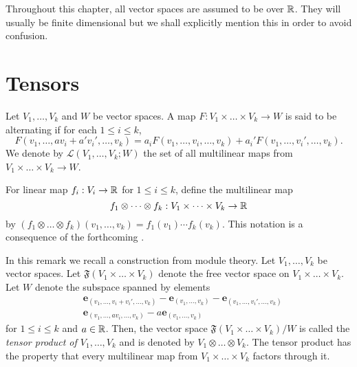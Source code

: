 Throughout this chapter, all vector spaces are assumed to be over $\mathbb{R}$. They will usually be finite dimensional but we shall explicitly mention this in order to avoid confusion.

\section{Tensors}

\begin{definition}
    Let $V_1,\dots,V_k$ and $W$ be vector spaces. A map $F: V_1\times\dots\times V_k\to W$ is said to be alternating if for each $1\le i\le k$, 
    \begin{equation*}
        F(v_1,\dots,av_i + a'v_i',\dots,v_k) = a_iF(v_1,\dots,v_i,\dots,v_k) + a_i'F(v_1,\dots,v_i',\dots,v_k).
    \end{equation*}
    We denote by $\mathscr L(V_1,\dots,V_k;W)$ the set of all multilinear maps from $V_1\times\dots\times V_k\to W$.
\end{definition}

For linear map $f_i: V_i\to\mathbb{R}$ for $1\le i\le k$, define the multilinear map 
\begin{equation*}
    f_1\otimes\dots\otimes f_k: V_1\times\dots\times V_k\to\mathbb{R}
\end{equation*}
by $(f_1\otimes\dots\otimes f_k)(v_1,\dots,v_k) = f_1(v_1)\cdots f_k(v_k)$. This notation is a consequence of the forthcoming .

\begin{remark}
    In this remark we recall a construction from module theory. Let $V_1,\dots,V_k$ be vector spaces. Let $\mathfrak F(V_1\times\dots\times V_k)$ denote the free vector space on $V_1\times\dots\times V_k$. Let $W$ denote the subspace spanned by elements 
    \begin{align*}
        & \mathbf{e}_{(v_1,\dots,v_i + v_i',\dots,v_k)} - \mathbf{e}_{(v_1,\dots,v_k)} - \mathbf{e}_{(v_1,\dots,v_i',\dots,v_k)}\\
        & \mathbf{e}_{(v_1,\dots,av_i,\dots,v_k)} - a\mathbf{e}_{(v_1,\dots,v_k)}
    \end{align*}
    for $1\le i\le k$ and $a\in\mathbb{R}$. Then, the vector space $\mathfrak{F}(V_1\times\dots\times V_k)/W$ is called the \emph{tensor product of $V_1,\dots,V_k$} and is denoted by $V_1\otimes\dots\otimes V_k$. The tensor product has the property that every multilinear map from $V_1\times\dots\times V_k$ factors through it.
\end{remark}

